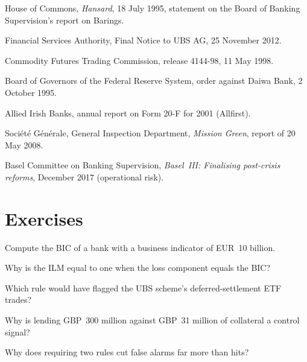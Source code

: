 \begin{omsources}
\item House of Commons, \emph{Hansard}, 18 July 1995, statement on the Board of Banking Supervision's
report on Barings.
\item Financial Services Authority, Final Notice to UBS AG, 25 November 2012.
\item Commodity Futures Trading Commission, release 4144-98, 11 May 1998.
\item Board of Governors of the Federal Reserve System, order against Daiwa Bank, 2 October 1995.
\item Allied Irish Banks, annual report on Form 20-F for 2001 (Allfirst).
\item Soci\'et\'e G\'en\'erale, General Inspection Department, \emph{Mission Green}, report of 20 May 2008.
\item Basel Committee on Banking Supervision, \emph{Basel~III: Finalising post-crisis reforms}, December
2017 (operational risk).
\end{omsources}

\section{Exercises}

\begin{exercise}[$\star$]\label{exo:rc:operational-risk-and-rogue-trading:1}
Compute the BIC of a bank with a business indicator of EUR~10 billion.
\end{exercise}

\begin{exercise}[$\star$]\label{exo:rc:operational-risk-and-rogue-trading:2}
Why is the ILM equal to one when the loss component equals the BIC?
\end{exercise}

\begin{exercise}[$\star$]\label{exo:rc:operational-risk-and-rogue-trading:3}
Which rule would have flagged the UBS scheme's deferred-settlement ETF trades?
\end{exercise}

\begin{exercise}[$\star\star$]\label{exo:rc:operational-risk-and-rogue-trading:4}
Why is lending GBP~300 million against GBP~31 million of collateral a control signal?
\end{exercise}

\begin{exercise}[$\star\star$]\label{exo:rc:operational-risk-and-rogue-trading:5}
Why does requiring two rules cut false alarms far more than hits?
\end{exercise}

